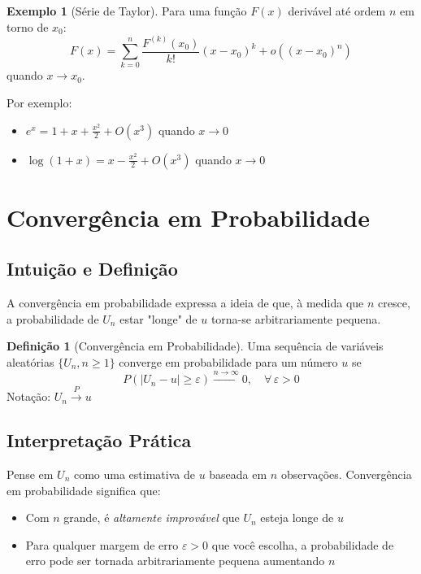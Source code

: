 \documentclass[12pt,a4paper]{article}
\theoremstyle{definition}
\newtheorem{definicao}{Definição}[section]
\newtheorem{exemplo}{Exemplo}[section]
\theoremstyle{plain}
\begin{document}
\begin{exemplo}[Série de Taylor]
Para uma função $F(x)$ derivável até ordem $n$ em torno de $x_0$:
\[
F(x) = \sum_{k=0}^{n} \frac{F^{(k)}(x_0)}{k!}(x - x_0)^k + o\left((x - x_0)^n\right)
\]
quando $x \to x_0$.

Por exemplo:
\begin{itemize}
    \item $e^x = 1 + x + \frac{x^2}{2} + O(x^3)$ quando $x \to 0$
    \item $\log(1+x) = x - \frac{x^2}{2} + O(x^3)$ quando $x \to 0$
\end{itemize}
\end{exemplo}

\section{Convergência em Probabilidade}

\subsection{Intuição e Definição}

A convergência em probabilidade expressa a ideia de que, à medida que $n$ cresce, a probabilidade de $U_n$ estar "longe" de $u$ torna-se arbitrariamente pequena.

\begin{definicao}[Convergência em Probabilidade]
Uma sequência de variáveis aleatórias $\{U_n, n \geq 1\}$ converge em probabilidade para um número $u$ se
\[
P\left(|U_n - u| \geq \varepsilon\right) \xrightarrow{n \to \infty} 0, \quad \forall\, \varepsilon > 0
\]
Notação: $U_n \xrightarrow{P} u$
\end{definicao}

\subsection{Interpretação Prática}

Pense em $U_n$ como uma estimativa de $u$ baseada em $n$ observações. Convergência em probabilidade significa que:
\begin{itemize}
    \item Com $n$ grande, é \emph{altamente improvável} que $U_n$ esteja longe de $u$
    \item Para qualquer margem de erro $\varepsilon > 0$ que você escolha, a probabilidade de erro pode ser tornada arbitrariamente pequena aumentando $n$
\end{itemize}
\end{document}
